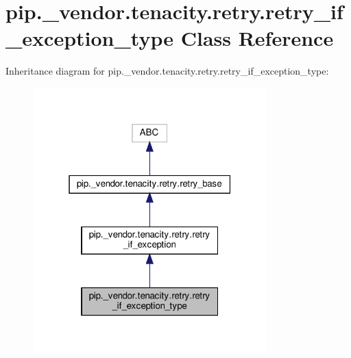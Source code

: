 \hypertarget{classpip_1_1__vendor_1_1tenacity_1_1retry_1_1retry__if__exception__type}{}\section{pip.\+\_\+vendor.\+tenacity.\+retry.\+retry\+\_\+if\+\_\+exception\+\_\+type Class Reference}
\label{classpip_1_1__vendor_1_1tenacity_1_1retry_1_1retry__if__exception__type}


Inheritance diagram for pip.\+\_\+vendor.\+tenacity.\+retry.\+retry\+\_\+if\+\_\+exception\+\_\+type\+:
\nopagebreak
\begin{figure}[H]
\begin{center}
\leavevmode
\includegraphics[width=256pt]{classpip_1_1__vendor_1_1tenacity_1_1retry_1_1retry__if__exception__type__inherit__graph}
\end{center}
\end{figure}


